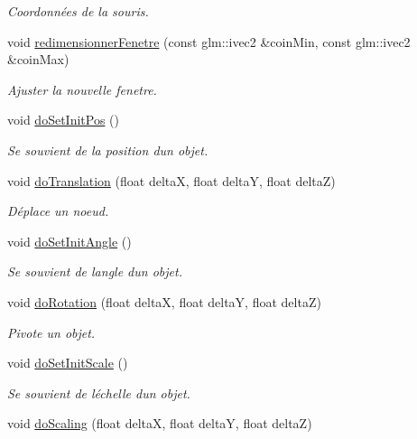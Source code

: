 \begin{DoxyCompactItemize}
\begin{DoxyCompactList}\small\item\em Coordonnées de la souris. \end{DoxyCompactList}\item 
void \hyperlink{group__inf2990_ga0a03742a7fa2215a6dd6de99cbfd7b05}{redimensionner\+Fenetre} (const glm\+::ivec2 \&coin\+Min, const glm\+::ivec2 \&coin\+Max)
\begin{DoxyCompactList}\small\item\em Ajuster la nouvelle fenetre. \end{DoxyCompactList}\item 
void \hyperlink{group__inf2990_gacbc609209644f410f7a576a8d1e509d0}{do\+Set\+Init\+Pos} ()
\begin{DoxyCompactList}\small\item\em Se souvient de la position d\textquotesingle{}un objet. \end{DoxyCompactList}\item 
void \hyperlink{group__inf2990_ga3c29bb5fb742aacf7bea3f62357c4f48}{do\+Translation} (float delta\+X, float delta\+Y, float delta\+Z)
\begin{DoxyCompactList}\small\item\em Déplace un noeud. \end{DoxyCompactList}\item 
void \hyperlink{group__inf2990_gadf7aee8a39d60a055bef3cd05cdda2db}{do\+Set\+Init\+Angle} ()
\begin{DoxyCompactList}\small\item\em Se souvient de l\textquotesingle{}angle d\textquotesingle{}un objet. \end{DoxyCompactList}\item 
void \hyperlink{group__inf2990_ga51bb0f8d8e9a6c421ca688e83e10d670}{do\+Rotation} (float delta\+X, float delta\+Y, float delta\+Z)
\begin{DoxyCompactList}\small\item\em Pivote un objet. \end{DoxyCompactList}\item 
void \hyperlink{group__inf2990_gaccc885ec8fc20fa6709a2f74a609ce32}{do\+Set\+Init\+Scale} ()
\begin{DoxyCompactList}\small\item\em Se souvient de l\textquotesingle{}échelle d\textquotesingle{}un objet. \end{DoxyCompactList}\item 
void \hyperlink{group__inf2990_gac8decb6e4a3eabfa6baa89022aaab8eb}{do\+Scaling} (float delta\+X, float delta\+Y, float delta\+Z)

\end{DoxyCompactItemize}
